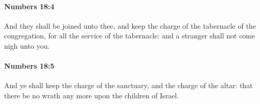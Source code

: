 		\paragraph{Numbers 18:4} %
			\label{NUMBERS-18-4}

			And they shall be joined unto thee, and keep the charge of the tabernacle of the congregation, for all the service of the tabernacle: and a stranger shall not come nigh unto you.


		\paragraph{Numbers 18:5} %
			\label{NUMBERS-18-5}

			And ye shall keep the charge of the sanctuary, and the charge of the altar: that there be no wrath any more upon the children of Israel.


